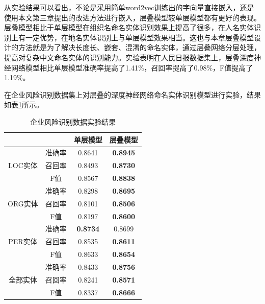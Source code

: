 \documentclass[winfonts,master,oneside,nobackinfo]{njuthesis}
\begin{document}
从实验结果可以看出，不论是采用简单word2vec训练出的字向量直接嵌入，还是使用本文第三章提出的改进方法进行嵌入，层叠模型较单层模型都有更好的表现。层叠模型相比于单层模型在组织名命名实体识别效果上提高了很多，在人名实体识别上有一定优势，在地名实体识别上与单层模型效果相当。这也与本章层叠模型设计的方法就是为了解决长度长、嵌套、混淆的命名实体，通过层叠网络分层处理，提高对复杂中文命名实体的识别能力。实验表明在人民日报数据集上，层叠深度神经网络模型相比单层模型准确率提高了1.41\%，召回率提高了0.98\%，F值提高了1.19\%。

在企业风险识别数据集上对层叠的深度神经网络命名实体识别模型进行实验，结果如表\ref{risk}所示。
\begin{table}[h]
\centering
\begin{tabular}{|c|c|c|c|}
\hline
\multicolumn{2}{|c|}{}                  & 单层模型           & 层叠模型          \\ \hline
\multirow{3}{*}{LOC实体}       & 准确率      & 0.8641         & \textbf{0.8945}        \\ \cline{2-4} 
                             & 召回率      & 0.8493         & \textbf{0.8730}        \\ \cline{2-4} 
                             & F值       & 0.8567         & \textbf{0.8838}        \\ \hline
\multirow{3}{*}{ORG实体}       & 准确率      & 0.8298         & \textbf{0.8695}        \\ \cline{2-4} 
                             & 召回率      & 0.8101         & \textbf{0.8506}        \\ \cline{2-4} 
                             & F值       & 0.8197         & \textbf{0.8600}        \\ \hline
\multirow{3}{*}{PER实体}       & 准确率      & \textbf{0.8734}         & 0.8699        \\ \cline{2-4} 
                             & 召回率      & 0.8535         & \textbf{0.8611}        \\ \cline{2-4} 
                             & F值       & 0.8633         & \textbf{0.8654}        \\ \hline
\multirow{3}{*}{全部实体}        & 准确率      & 0.8433         & \textbf{0.8756}        \\ \cline{2-4} 
                             & 召回率      & 0.8241         & \textbf{0.8571}        \\ \cline{2-4} 
                             & F值       & 0.8337         &\textbf{0.8666}        \\ \hline
\end{tabular}
\caption{企业风险识别数据实验结果}
\label{risk}
\end{table}
\end{document}

